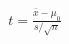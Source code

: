\documentclass[preview]{standalone}
\begin{document}
\begin{align*}
t = \frac{\bar{x} - \mu_0}{s / \sqrt{n}}
\end{align*}
\end{document}
